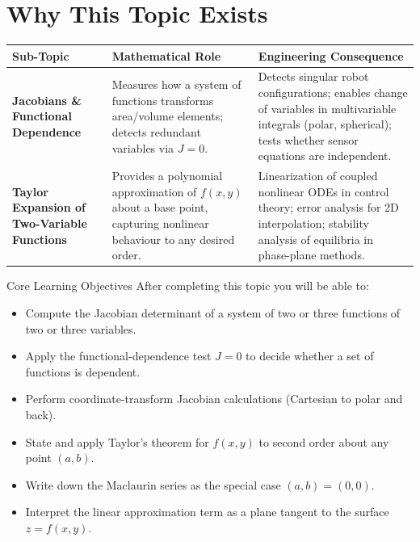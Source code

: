 \documentclass[12pt,a4paper]{article}
\begin{document}
\section{Why This Topic Exists}

\begin{center}
\begin{tabular}{>{\bfseries}p{3.5cm} p{5cm} p{6cm}}
\toprule
Sub-Topic & Mathematical Role & Engineering Consequence \\
\midrule
Jacobians \& Functional Dependence &
  Measures how a system of functions transforms area/volume elements; detects redundant variables via \( J = 0 \). &
  Detects singular robot configurations; enables change of variables in multivariable integrals (polar, spherical); tests whether sensor equations are independent. \\[6pt]
Taylor Expansion of Two-Variable Functions &
  Provides a polynomial approximation of \( f(x,y) \) about a base point, capturing nonlinear behaviour to any desired order. &
  Linearization of coupled nonlinear ODEs in control theory; error analysis for 2D interpolation; stability analysis of equilibria in phase-plane methods. \\
\bottomrule
\end{tabular}
\end{center}

\begin{learnbox}{Core Learning Objectives}
After completing this topic you will be able to:
\begin{itemize}[leftmargin=*]
  \item Compute the Jacobian determinant of a system of two or three functions of two or three variables.
  \item Apply the functional-dependence test \( J = 0 \) to decide whether a set of functions is dependent.
  \item Perform coordinate-transform Jacobian calculations (Cartesian to polar and back).
  \item State and apply Taylor's theorem for \( f(x,y) \) to second order about any point \( (a,b) \).
  \item Write down the Maclaurin series as the special case \( (a,b) = (0,0) \).
  \item Interpret the linear approximation term as a plane tangent to the surface \( z = f(x,y) \).
\end{itemize}
\end{learnbox}
\end{document}
